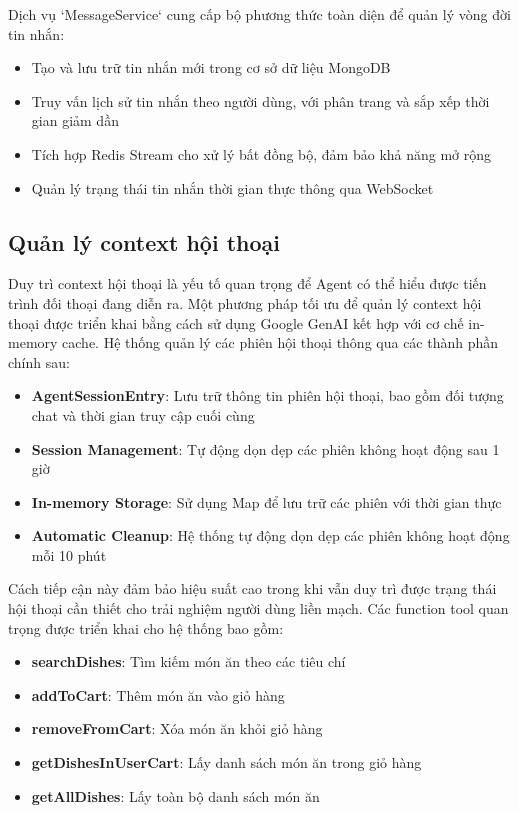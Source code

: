 Dịch vụ `MessageService` cung cấp bộ phương thức toàn diện để quản lý vòng đời tin nhắn:

\begin{itemize}
    \item Tạo và lưu trữ tin nhắn mới trong cơ sở dữ liệu MongoDB
    \item Truy vấn lịch sử tin nhắn theo người dùng, với phân trang và sắp xếp thời gian giảm dần
    \item Tích hợp Redis Stream cho xử lý bất đồng bộ, đảm bảo khả năng mở rộng
    \item Quản lý trạng thái tin nhắn thời gian thực thông qua WebSocket
\end{itemize}

\subsection{Quản lý context hội thoại}

Duy trì context hội thoại là yếu tố quan trọng để Agent có thể hiểu được tiến trình đối thoại đang diễn ra. Một phương pháp tối ưu để quản lý context hội thoại được triển khai bằng cách sử dụng Google GenAI kết hợp với cơ chế in-memory cache. Hệ thống quản lý các phiên hội thoại thông qua các thành phần chính sau:

\begin{itemize}
    \item \textbf{AgentSessionEntry}: Lưu trữ thông tin phiên hội thoại, bao gồm đối tượng chat và thời gian truy cập cuối cùng
    \item \textbf{Session Management}: Tự động dọn dẹp các phiên không hoạt động sau 1 giờ
    \item \textbf{In-memory Storage}: Sử dụng Map để lưu trữ các phiên với thời gian thực
    \item \textbf{Automatic Cleanup}: Hệ thống tự động dọn dẹp các phiên không hoạt động mỗi 10 phút
\end{itemize}

Cách tiếp cận này đảm bảo hiệu suất cao trong khi vẫn duy trì được trạng thái hội thoại cần thiết cho trải nghiệm người dùng liền mạch. Các function tool quan trọng được triển khai cho hệ thống bao gồm:

\begin{itemize}
    \item \textbf{searchDishes}: Tìm kiếm món ăn theo các tiêu chí
    \item \textbf{addToCart}: Thêm món ăn vào giỏ hàng
    \item \textbf{removeFromCart}: Xóa món ăn khỏi giỏ hàng
    \item \textbf{getDishesInUserCart}: Lấy danh sách món ăn trong giỏ hàng
    \item \textbf{getAllDishes}: Lấy toàn bộ danh sách món ăn
\end{itemize}

